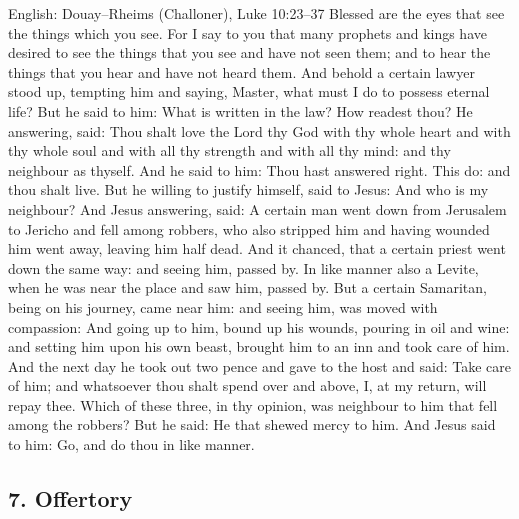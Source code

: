\begin{namedtranslation}{English: Douay--Rheims (Challoner), Luke 10:23--37}
Blessed are the eyes that see the things which you see. For I say to you that
many prophets and kings have desired to see the things that you see and have
not seen them; and to hear the things that you hear and have not heard them.
And behold a certain lawyer stood up, tempting him and saying, Master, what
must I do to possess eternal life? But he said to him: What is written in the
law? How readest thou? He answering, said: Thou shalt love the Lord thy God
with thy whole heart and with thy whole soul and with all thy strength and
with all thy mind: and thy neighbour as thyself. And he said to him: Thou hast
answered right. This do: and thou shalt live. But he willing to justify
himself, said to Jesus: And who is my neighbour? And Jesus answering, said: A
certain man went down from Jerusalem to Jericho and fell among robbers, who
also stripped him and having wounded him went away, leaving him half dead. And
it chanced, that a certain priest went down the same way: and seeing him,
passed by. In like manner also a Levite, when he was near the place and saw
him, passed by. But a certain Samaritan, being on his journey, came near him:
and seeing him, was moved with compassion: And going up to him, bound up his
wounds, pouring in oil and wine: and setting him upon his own beast, brought
him to an inn and took care of him. And the next day he took out two pence and
gave to the host and said: Take care of him; and whatsoever thou shalt spend
over and above, I, at my return, will repay thee. Which of these three, in thy
opinion, was neighbour to him that fell among the robbers? But he said: He
that shewed mercy to him. And Jesus said to him: Go, and do thou in like
manner.
\end{namedtranslation}


\elementguard
\subsection*{7. Offertory }

